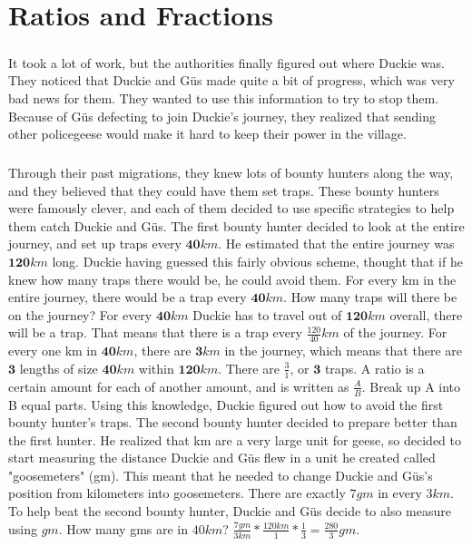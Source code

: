\chapter{Ratios and Fractions}
\paragraph{} It took a lot of work, but the authorities finally figured out where Duckie was. They noticed that Duckie and Güs made quite a bit of progress, which was very bad news for them. They wanted to use this information to try to stop them. Because of Güs defecting to join Duckie's journey, they realized that sending other policegeese would make it hard to keep their power in the village. 
\paragraph{} Through their past migrations, they knew lots of bounty hunters along the way, and they believed that they could have them set traps. These bounty hunters were famously clever, and each of them decided to use specific strategies to help them catch Duckie and Güs.
\vfill
\pagebreak
{The first bounty hunter decided to look at the entire journey, and set up traps every $\textbf{40} km$. He estimated that the entire journey was $\textbf{120} km$ long. Duckie having guessed this fairly obvious scheme,  thought that if he knew how many traps there would be, he could avoid them. For every km in the entire journey, there would be a trap every $\textbf{40} km$. How many traps will there be on the journey?}
{For every $\textbf{40} km$ Duckie has to travel out of $\textbf{120} km$ overall, there will be a trap. That means that there is a trap every $\frac{120}{40} km$ of the journey. For every one km in $\textbf{40} km$, there are $\textbf{3} km$ in the journey, which means that there are $\textbf{3}$ lengths of size $\textbf{40} km$ within $\textbf{120} km$. There are $\frac{3}{1}$, or $\textbf{3}$ traps.}
{A ratio is a certain amount for each of another amount, and is written as $\frac{A}{B}$. Break up A into B equal parts.}
{}
{Using this knowledge, Duckie figured out how to avoid the first bounty hunter's traps. The second bounty hunter decided to prepare better than the first hunter. He realized that km are a very large unit for geese, so decided to start measuring the distance Duckie and Güs flew in a unit he created called "goosemeters" (gm). This meant that he needed to change Duckie and Güs's position from kilometers into goosemeters. There are exactly $7 gm$ in every $3 km$. To help beat the second bounty hunter, Duckie and Güs decide to also measure using $gm$. How many gms are in $40 km$?}{
$\frac{7 gm}{3 km}\ast\frac{120 km}{1}\ast\frac{1}{3}=\frac{280}{3} gm$.}
